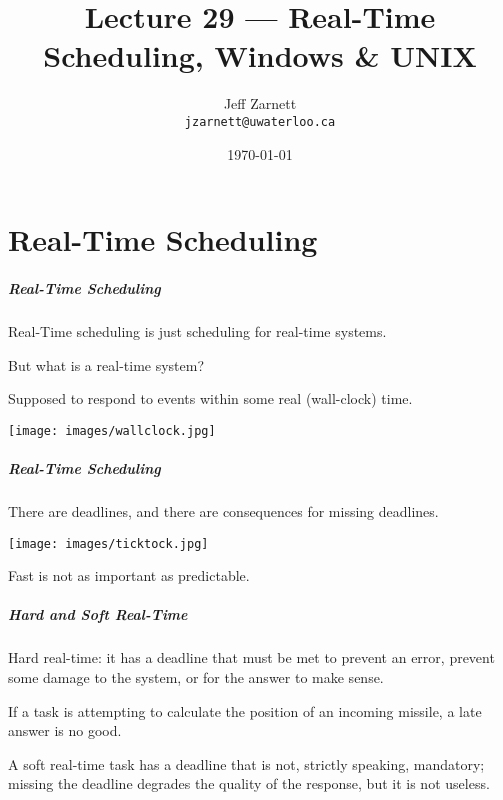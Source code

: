 

\title{Lecture 29 --- Real-Time Scheduling, Windows \& UNIX}

\author{Jeff Zarnett \\ \small \texttt{jzarnett@uwaterloo.ca}}
\date{\today}




\begin{frame}
  \titlepage

 \end{frame}

\part{Real-Time Scheduling}

\begin{frame}
\partpage
\end{frame}

\begin{frame}
\frametitle{Real-Time Scheduling}

Real-Time scheduling is just scheduling for real-time systems.

But what is a real-time system?

Supposed to respond to events within some real (wall-clock) time. 

\begin{center}
	\texttt{[image: images/wallclock.jpg]}
\end{center}

\end{frame}

\begin{frame}
\frametitle{Real-Time Scheduling}

There are deadlines, and there are consequences for missing deadlines. 

\begin{center}
	\texttt{[image: images/ticktock.jpg]}
\end{center}

Fast is not as important as predictable.

\end{frame}

\begin{frame}
\frametitle{Hard and Soft Real-Time}

\alert{Hard real-time}: it has a deadline that must be met to prevent an error, prevent some damage to the system, or for the answer to make sense. 

If a task is attempting to calculate the position of an incoming missile, a late answer is no good. 

A \alert{soft real-time} task has a deadline that is not, strictly speaking, mandatory; missing the deadline degrades the quality of the response, but it is not useless.


\end{frame}

